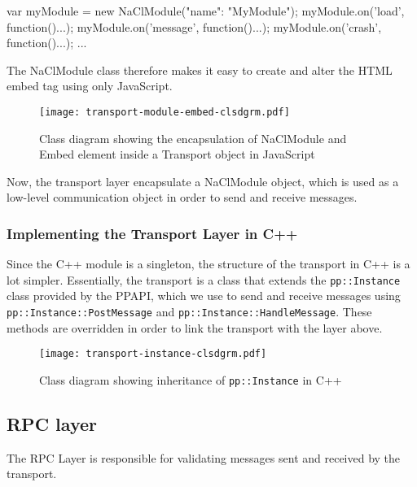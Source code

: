 \begin{code}
var myModule = new NaClModule({"name": "MyModule"});
myModule.on('load', function(){...});
myModule.on('message', function(){...});
myModule.on('crash', function(){...});
...
\end{code}

The NaClModule class therefore makes it easy to create and alter the HTML embed tag using only JavaScript. 

\begin{figure}
    \centering
    \texttt{[image: transport-module-embed-clsdgrm.pdf]} 
    \caption{Class diagram showing the encapsulation of NaClModule and Embed element inside a Transport object in JavaScript}
    \label{fig:naclmodule-embed}
\end{figure}

Now, the transport layer encapsulate a NaClModule object, which is used as a low-level communication object in order to send and receive messages. 



\subsubsection{Implementing the Transport Layer in C++} %
\label{ssub:implementing_the_transport_layer_in_cpp_}
Since the C++ module is a singleton, the structure of the transport in C++ is a lot simpler. Essentially, the transport is a class that extends the \lstinline{pp::Instance} class provided by the PPAPI, which we use to send and receive messages using \lstinline{pp::Instance::PostMessage} and \lstinline{pp::Instance::HandleMessage}. These methods are overridden in order to link the transport with the layer above.

\begin{figure}
    \centering
    \texttt{[image: transport-instance-clsdgrm.pdf]} 
    \caption{Class diagram showing inheritance of \lstinline{pp::Instance} in C++}
    \label{fig:instance-transport}
\end{figure}




\subsection{RPC layer} %
\label{sub:json_rpc_layer_design}
The RPC Layer is responsible for validating messages sent and received by the transport. 

